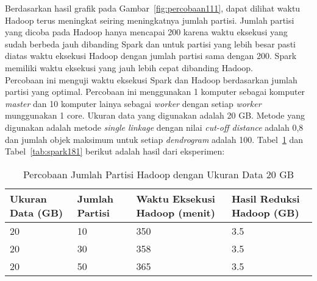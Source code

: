 Berdasarkan hasil grafik pada Gambar~\ref{fig:percobaan111}, dapat dilihat waktu Hadoop terus meningkat seiring meningkatnya jumlah partisi. Jumlah partisi yang dicoba pada Hadoop hanya mencapai 200 karena waktu eksekusi yang sudah berbeda jauh dibanding Spark dan untuk partisi yang lebih besar pasti diatas waktu eksekusi Hadoop dengan jumlah partisi sama dengan 200. Spark memiliki waktu eksekusi yang jauh lebih cepat dibanding Hadoop. \\




Percobaan ini menguji waktu eksekusi Spark dan Hadoop berdasarkan jumlah partisi yang optimal. Percobaan ini menggunakan 1 komputer sebagai komputer \textit{master} dan 10 komputer lainya sebagai \textit{worker} dengan setiap \textit{worker} munggunakan 1 core. Ukuran data yang digunakan adalah 20 GB. Metode yang digunakan adalah metode \textit{single linkage} dengan nilai \textit{cut-off distance} adalah 0,8 dan jumlah objek maksimum untuk setiap \textit{dendrogram} adalah 100. Tabel~\ref{tab:spark171} dan Tabel~\ref{tab:spark181} berikut adalah hasil dari eksperimen:





\begin{table}[H] 
	\centering 
	\caption{Percobaan Jumlah Partisi Hadoop dengan Ukuran Data 20 GB}
	\label{tab:spark171}
	\begin{tabular}{|p{3cm}|p{3cm}|p{4cm}|p{4cm}|}
\hline
Ukuran Data (GB) & Jumlah Partisi &  Waktu Eksekusi Hadoop (menit) & Hasil Reduksi Hadoop (GB)\\
\hline
20 & 10 & 350  & 3.5  \\
\hline
20 & 30 & 358  & 3.5  \\
\hline
20 & 50 & 365  & 3.5  \\
\hline


\hline

	\end{tabular} 
\end{table}




